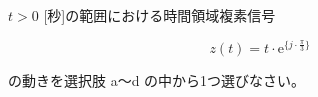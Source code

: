 $t > 0$ [秒]の範囲における時間領域複素信号 

\[
z(t) = t \cdot \textrm{e}^{\{ j \cdot \frac{\pi}{3} \}}
\]

\medskip
\noindent の動きを選択肢 a〜d の中から1つ選びなさい。
